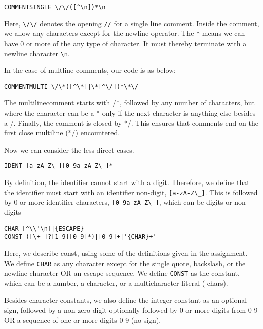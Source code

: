 \documentclass{article}
\begin{document}
\begin{verbatim}
COMMENTSINGLE \/\/([^\n])*\n
\end{verbatim}

Here, \verb|\/\/| denotes the opening \verb|//| for a single line comment. Inside the comment, we allow any characters except for the newline operator. The \verb|*| means we can have 0 or more of the any type of character. It must thereby terminate with a newline character \verb|\n|.

In the case of multline comments, our code is as below:

\begin{verbatim}
COMMENTMULTI \/\*([^\*]|\*[^\/])*\*\/
\end{verbatim}

The multilinecomment starts with /*, followed by any number of characters, but where the character can be a * only if the next character is anything else besides a /. Finally, the comment is closed by */. This ensures that comments end on the first close multiline (*/) encountered.\bigskip

Now we can consider the less direct cases.

\begin{verbatim}
IDENT [a-zA-Z\_][0-9a-zA-Z\_]*
\end{verbatim}

By definition, the identifier cannot start with a digit. Therefore, we define that the identifier must start with an identifier non-digit, \verb|[a-zA-Z\_]|. This is followed by 0 or more identifier characters, \verb|[0-9a-zA-Z\_]|, which can be digits or non-digits

\begin{verbatim}
CHAR [^\\'\n]|{ESCAPE}
CONST ([\+-]?[1-9][0-9]*)|[0-9]+|'{CHAR}+'
\end{verbatim}

Here, we describe const, using some of the definitions given in the assignment. We define \verb|CHAR| as any character except for the single quote, backslash, or the newline character OR an escape sequence. We define \verb|CONST| as the constant, which can be a number, a character, or a multicharacter literal ( chars).\bigskip

Besides character constants, we also define the integer constant as an optional sign, followed by a non-zero digit optionally followed by 0 or more digits from 0-9 OR a sequence of one or more digits 0-9 (no sign). \bigskip
\end{document}
